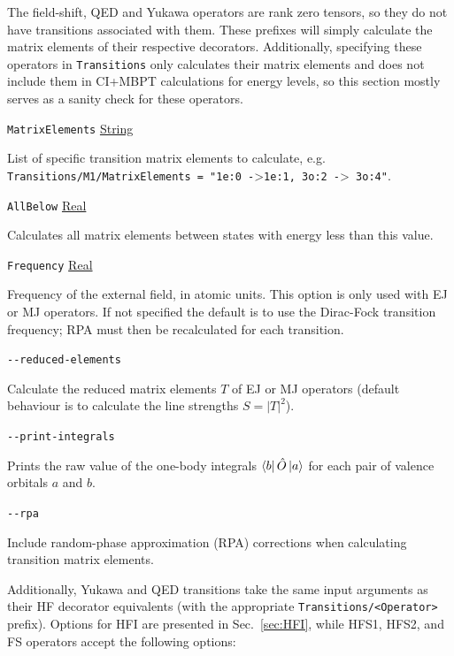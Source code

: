 \documentclass{report}
\begin{document}
The field-shift, QED and Yukawa operators are rank zero tensors, so they do not have transitions
associated with them. These prefixes will simply calculate the matrix elements of their respective
decorators. Additionally, specifying these operators in \texttt{Transitions} only calculates their
matrix elements and does not include them in CI+MBPT calculations for energy levels, so this
section mostly serves as a sanity check for these operators.

\texttt{MatrixElements} \uline{String}
\begin{adjustwidth}{1cm}{}
List of specific transition matrix elements to calculate, e.g.
\texttt{Transitions/M1/MatrixElements = "1e:0 -}\textgreater \texttt{1e:1, 3o:2 -}\textgreater\texttt{ 3o:4"}.
\end{adjustwidth}

\texttt{AllBelow} \uline{Real}
\begin{adjustwidth}{1cm}{}
Calculates all matrix elements between states with energy less than this value.
\end{adjustwidth}

\texttt{Frequency} \uline{Real}
\begin{adjustwidth}{1cm}{}
Frequency of the external field, in atomic units. This option is only used with EJ or MJ operators. If not specified the default is to use the Dirac-Fock transition frequency; RPA must then be recalculated for each transition.
\end{adjustwidth}

\texttt{{-}{-}reduced-elements} 
\begin{adjustwidth}{1cm}{}
Calculate the reduced matrix elements $T$ of EJ or MJ operators (default behaviour is to calculate the line strengths 
$S = |T|^2$).
\end{adjustwidth}

\texttt{{-}{-}print-integrals} 
\begin{adjustwidth}{1cm}{}
Prints the raw value of the one-body integrals $\bra{b}\hat{O}\ket{a}$ for each pair of valence 
orbitals $a$ and $b$.
\end{adjustwidth}

\texttt{{-}{-}rpa}
\begin{adjustwidth}{1cm}{}
Include random-phase approximation (RPA) corrections when calculating transition matrix elements. 
\end{adjustwidth}

Additionally, Yukawa and QED transitions take the same input arguments as their HF decorator equivalents (with the appropriate \hbox{\texttt{Transitions/\textless{Operator}\textgreater}} prefix). Options for HFI are presented in Sec.~\ref{sec:HFI}, while HFS1, HFS2, and FS operators accept the following options:
\end{document}

